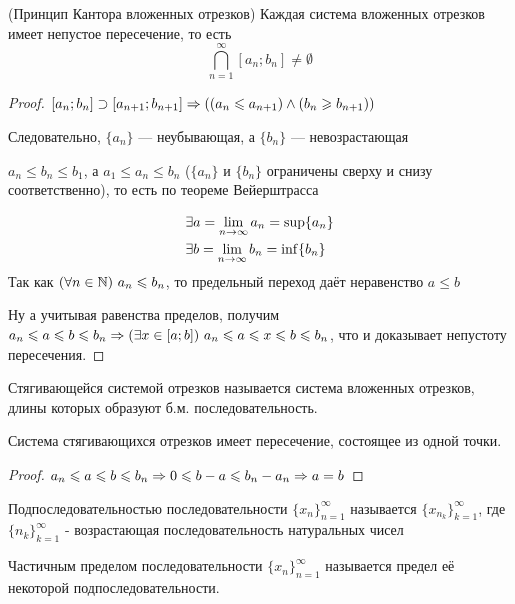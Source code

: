 \begin{theorem} (Принцип Кантора вложенных отрезков)
	Каждая система вложенных отрезков имеет непустое пересечение, то есть
	\[
		\bigcap\limits_{n = 1}^\infty [a_n; b_n]
		\neq \emptyset
	\]
\end{theorem}

\begin{proof}
	$[a_n; b_n] \supset [a_{n + 1}; b_{n + 1}] \Rightarrow \left((a_n \leqslant a_{n + 1}) \wedge (b_n \geqslant b_{n + 1})\right)$
	
	Следовательно, $\{a_n\}$ --- неубывающая, а $\{b_n\}$ ---
	невозрастающая
	
	$a_n \le b_n \le b_1$, а $a_1 \le a_n \le b_n$ ($\{a_n\}$ и $\{b_n\}$
	ограничены сверху и снизу соответственно), то есть по теореме Вейерштрасса

	\begin{align*}
		&\exists a = \lim\limits_{n \rightarrow \infty} a_n = \sup \{a_n\}
		\\
		&\exists b = \lim\limits_{n \rightarrow \infty} b_n = \inf \{b_n\}
	\end{align*}
	Так как $(\forall n \in \mathbb{N})\ a_n \leqslant b_n$, то предельный переход даёт неравенство $a \le b$
	
	Ну а учитывая равенства пределов, получим $a_n \leqslant a \leqslant
	b \leqslant b_n \Rightarrow (\exists x \in [a; b])\ a_n \leqslant a \leqslant x \leqslant
	b \leqslant b_n$, что и доказывает непустоту пересечения.
\end{proof}

\begin{definition}
	Стягивающейся системой отрезков называется система вложенных
	отрезков, длины которых образуют б.м. последовательность.
\end{definition}

\begin{addition}
	Система стягивающихся отрезков имеет пересечение, состоящее
	из одной точки.
\end{addition}

\begin{proof}
	$a_n \leqslant a \leqslant b \leqslant b_n \Rightarrow 0 \leqslant b - a \leqslant b_n - a_n
	\Rightarrow a = b$
\end{proof}

\begin{definition}
	Подпоследовательностью последовательности
	$\{x_n\}_{n = 1}^\infty$ называется $\{x_{n_k}\}_{k = 1}^\infty$,
	где $\{n_k\}_{k = 1}^\infty$ - возрастающая последовательность
	натуральных чисел
\end{definition}

\begin{definition}
	Частичным пределом последовательности $\{x_n\}_{n = 1}^\infty$
	называется предел её некоторой подпоследовательности.
\end{definition}

